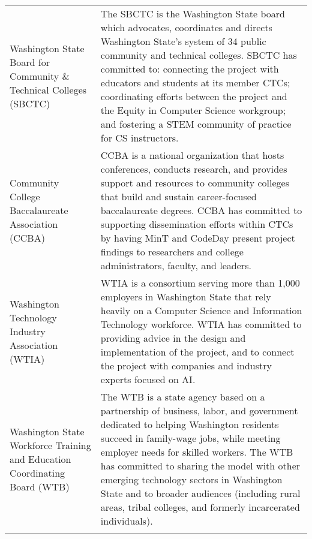 \begin{tabularx}{\textwidth}{L{0.4} L{0.7}}
    Washington State Board for Community \& Technical Colleges (SBCTC)\footnotemark[1] &
    The SBCTC is the Washington State board which advocates, coordinates and directs Washington State's system of 34 public community and technical colleges. \newline\vspace{8pt}
    SBCTC has committed to: connecting the project with educators and students at its member CTCs; coordinating efforts between the project and the Equity in Computer Science workgroup; and fostering a STEM community of practice for CS instructors. \\ \addlinespace[8pt]

    Community College Baccalaureate Association (CCBA)\footnotemark[1] &
    CCBA is a national organization that hosts conferences, conducts research, and provides support and resources to community colleges that build and sustain career-focused baccalaureate degrees. \newline\vspace{8pt}
    CCBA has committed to supporting dissemination efforts within CTCs by having MinT and CodeDay present project findings to researchers and college administrators, faculty, and leaders. \\ \addlinespace[8pt]

    Washington Technology Industry Association (WTIA)\footnotemark[1] &
    WTIA is a consortium serving more than 1,000 employers in Washington State that rely heavily on a Computer Science and Information Technology workforce. \newline\vspace{8pt}
    WTIA has committed to providing advice in the design and implementation of the project, and to connect the project with companies and industry experts focused on AI. \\ \addlinespace[8pt]

    Washington State Workforce Training and Education Coordinating Board (WTB)\footnotemark[1] &
    The WTB is a state agency based on a partnership of business, labor, and government dedicated to helping Washington residents succeed in family-wage jobs, while meeting employer needs for skilled workers. \newline\vspace{8pt}
    The WTB has committed to sharing the model with other emerging technology sectors in Washington State and to broader audiences (including rural areas, tribal colleges, and formerly incarcerated individuals). \\ \addlinespace[8pt]


\end{tabularx}
